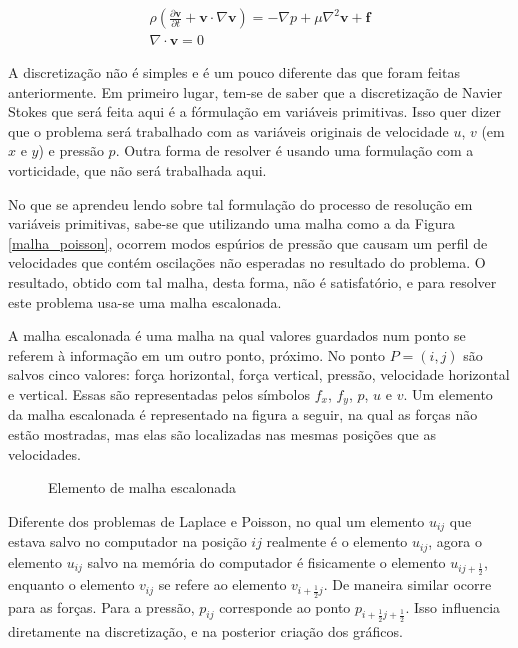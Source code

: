 \documentclass[journal]{IEEEtran}
\begin{document}
\begin{eqnarray}
\rho\left( \frac{\partial \textbf{v}}{\partial
t}+\textbf{v}\cdot\nabla\textbf{v}\right)=-\nabla
p+\mu\nabla^2\textbf{v}+\textbf{f} \label{ns}\\
 \nabla\cdot \textbf{v}=0 \label{divergente_zero}
\end{eqnarray}

A discretização não é simples e é um pouco diferente das que foram feitas anteriormente. Em primeiro lugar, tem-se de saber que a discretização de Navier Stokes que será feita aqui é a fórmulação em variáveis primitivas. Isso quer dizer que o problema será trabalhado com as variáveis originais de velocidade $u$, $v$ (em $x$ e $y$) e pressão $p$. Outra forma de resolver é usando uma formulação com a vorticidade, que não será trabalhada aqui.

No que se aprendeu lendo sobre tal formulação do processo de resolução em variáveis primitivas, sabe-se que utilizando uma malha como a da Figura \ref{malha_poisson}, ocorrem modos espúrios de pressão que causam um perfil de velocidades que contém oscilações não esperadas no resultado do problema. O resultado, obtido com tal malha, desta forma, não é satisfatório, e para resolver este problema usa-se uma malha escalonada.

A malha escalonada é uma malha na qual valores guardados num ponto se referem à informação em um outro ponto, próximo. No ponto $P=(i,j)$ são salvos cinco valores: força horizontal, força vertical, pressão, velocidade horizontal e vertical. Essas são representadas pelos símbolos $f_x$, $f_y$, $p$, $u$ e $v$. Um elemento da malha escalonada é representado na figura a seguir, na qual as forças não estão mostradas, mas elas são localizadas nas mesmas posições que as velocidades.

\begin{figure}[!ht]
\centering
{}
\caption{Elemento de malha escalonada}
\end{figure}

Diferente dos problemas de Laplace e Poisson, no qual um elemento $u_{ij}$ que estava salvo no computador na posição $ij$ realmente é o elemento $u_{ij}$, agora o elemento $u_{ij}$ salvo na memória do computador é fisicamente o elemento $u_{ij+\frac{1}{2}}$, enquanto o elemento $v_{ij}$ se refere ao elemento $v_{i+\frac{1}{2}j}$. De maneira similar ocorre para as forças. Para a pressão, $p_{ij}$ corresponde ao ponto $p_{i+\frac{1}{2}j+\frac{1}{2}}$. Isso influencia diretamente na discretização, e na posterior criação dos gráficos.
\end{document}
